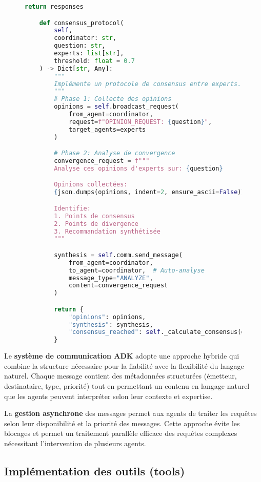 \begin{figure}[h]
\begin{lstlisting}[language=Python, caption=Architecture de communication inter-agents]
        return responses

    def consensus_protocol(
        self,
        coordinator: str,
        question: str,
        experts: list[str],
        threshold: float = 0.7
    ) -> Dict[str, Any]:
        """
        Implémente un protocole de consensus entre experts.
        """
        # Phase 1: Collecte des opinions
        opinions = self.broadcast_request(
            from_agent=coordinator,
            request=f"OPINION_REQUEST: {question}",
            target_agents=experts
        )

        # Phase 2: Analyse de convergence
        convergence_request = f"""
        Analyse ces opinions d'experts sur: {question}

        Opinions collectées:
        {json.dumps(opinions, indent=2, ensure_ascii=False)}

        Identifie:
        1. Points de consensus
        2. Points de divergence
        3. Recommandation synthétisée
        """

        synthesis = self.comm.send_message(
            from_agent=coordinator,
            to_agent=coordinator,  # Auto-analyse
            message_type="ANALYZE",
            content=convergence_request
        )

        return {
            "opinions": opinions,
            "synthesis": synthesis,
            "consensus_reached": self._calculate_consensus(opinions) > threshold
        }
\end{lstlisting}
\end{figure}

Le \textbf{système de communication ADK} adopte une approche hybride qui combine la structure nécessaire pour la fiabilité avec la flexibilité du langage naturel. Chaque message contient des métadonnées structurées (émetteur, destinataire, type, priorité) tout en permettant un contenu en langage naturel que les agents peuvent interpréter selon leur contexte et expertise.

La \textbf{gestion asynchrone} des messages permet aux agents de traiter les requêtes selon leur disponibilité et la priorité des messages. Cette approche évite les blocages et permet un traitement parallèle efficace des requêtes complexes nécessitant l'intervention de plusieurs agents.

\subsection{Implémentation des outils (tools)}

